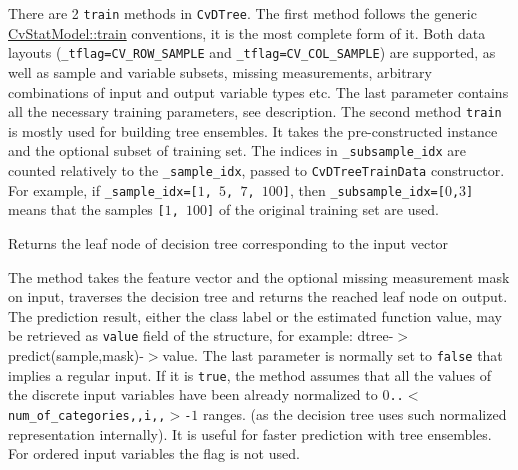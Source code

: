 There are 2 \texttt{train} methods in \texttt{CvDTree}.
\newline
\newline
The first method follows the generic \href{#CvStatModel.3A.3Atrain}{CvStatModel::train} conventions,  it is the most complete form of it. Both data layouts (\texttt{\_tflag=CV\_ROW\_SAMPLE} and \texttt{\_tflag=CV\_COL\_SAMPLE}) are supported, as well as sample and variable subsets, missing measurements, arbitrary combinations of input and output variable types etc. The last parameter contains all the necessary training parameters, see  description.
\newline
\newline
The second method \texttt{train} is mostly used for building tree ensembles. It takes the pre-constructed  instance and the optional subset of training set. The indices in \texttt{\_subsample\_idx} are counted relatively to the \texttt{\_sample\_idx}, passed to \texttt{CvDTreeTrainData} constructor. For example, if \texttt{\_sample\_idx=[$1$, $5$, $7$, $100$]}, then \texttt{\_subsample\_idx=[$0$,$3$]} means that the samples \texttt{[$1$, $100$]} of the original training set are used.



Returns the leaf node of decision tree corresponding to the input vector


The method takes the feature vector and the optional missing measurement mask on input, traverses the decision tree and returns the reached leaf node on output. The prediction result, either the class label or the estimated function value, may be retrieved as \texttt{value} field of the  structure, for example: dtree-$>$predict(sample,mask)-$>$value.
\newline
\newline
The last parameter is normally set to \texttt{false} that implies a regular input. If it is \texttt{true}, the method assumes that all the values of the discrete input variables have been already normalized to \texttt{$0$..$<$num\_of\_categories,,i,,$>$-$1$} ranges. (as the decision tree uses such normalized representation internally). It is useful for faster prediction with tree ensembles. For ordered input variables the flag is not used.

